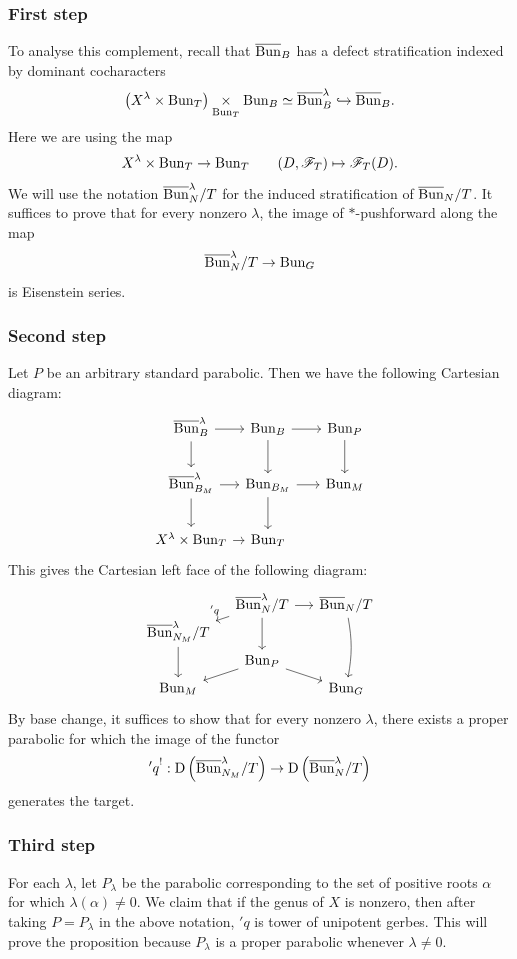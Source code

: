 \subsubsection{First step} To analyse this complement, recall that $\overline{\mathrm{Bun}}_B$ has a defect stratification indexed by dominant cocharacters
  \[
  \left(X^\lambda \times \mathrm{Bun}_T \right) \underset{\mathrm{Bun}_T}{\times} \mathrm{Bun}_B \simeq \overline{\mathrm{Bun}}_B^\lambda \hookrightarrow \overline{\mathrm{Bun}}_B.
  \]
Here we are using the map
    \[
    X^\lambda \times \mathrm{Bun}_T \to \mathrm{Bun}_T 
    \qquad (D, \mathscr{F}_T) \mapsto \mathscr{F}_T(D).
    \]
We will use the notation $\overline{\mathrm{Bun}}_N^\lambda / T$ for the induced stratification of $\overline{\mathrm{Bun}}_N / T$. It suffices to prove that for every nonzero $\lambda$, the image of $*$-pushforward along the map
    \[\overline{\mathrm{Bun}}_N^\lambda/T \to \mathrm{Bun}_G\]
is Eisenstein series.

\subsubsection{Second step} Let $P$ be an arbitrary standard parabolic. Then we have the following Cartesian diagram:
\[
\begin{tikzcd}[
  column sep={5.5em,between origins},
  row sep={4em,between origins}
]
  \Bunc_B^\lambda \arrow[r] \arrow[d] & \Bun_B \arrow[r] \arrow[d] & \Bun_P \arrow[d] \\
  \Bunc_{B_M}^\lambda \arrow[r] \arrow[d] & \Bun_{B_M} \arrow[r] \arrow[d] & \Bun_M \\
  X^\lambda \times \Bun_T \arrow[r] & \Bun_T &
\end{tikzcd}
\]
This gives the Cartesian left face of the following diagram:
\[
\begin{tikzcd}[
  column sep={6em,between origins},
  row sep={2em,between origins}
]
   & \Bunc_N^\lambda / T \arrow[r] \arrow[dl, " 'q" above left] \arrow[dd] & \Bunc_N / T \arrow[ddd, bend left=10]  \\
  \Bunc_{N_M}^\lambda / T \arrow[dd] & \\
  & \Bun_P \arrow[dl] \arrow[dr] & \\
  \Bun_M & & \Bun_G
\end{tikzcd}
\]
By base change, it suffices to show that for every nonzero $\lambda$, there exists a proper parabolic for which the image of the functor
  \[
  {'q}^! : \mathrm{D}\left( \overline{\mathrm{Bun}}_{N_M}^\lambda / T \right) \to \mathrm{D}\left( \overline{\mathrm{Bun}}_N^\lambda / T \right)
  \]
generates the target.

\subsubsection{Third step} For each $\lambda$, let $P_\lambda$ be the parabolic corresponding to the set of positive roots $\alpha$ for which $\lambda(\alpha) \neq 0$. We claim that if the genus of $X$ is nonzero, then after taking $P = P_\lambda$ in the above notation, $'q$ is tower of unipotent gerbes. This will prove the proposition because $P_\lambda$ is a proper parabolic whenever $\lambda \neq 0$.


